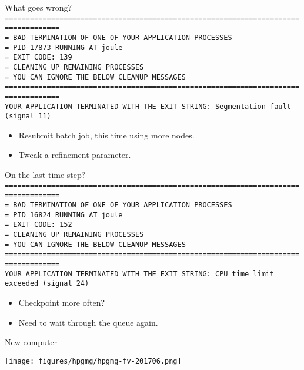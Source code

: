 \documentclass{beamer}
\begin{document}
\begin{frame}{What goes wrong?}
{\small \texttt{
=================================================================================== \\
=   BAD TERMINATION OF ONE OF YOUR APPLICATION PROCESSES \\
=   PID 17873 RUNNING AT joule \\
=   EXIT CODE: 139 \\
=   CLEANING UP REMAINING PROCESSES \\
=   YOU CAN IGNORE THE BELOW CLEANUP MESSAGES \\
=================================================================================== \\
YOUR APPLICATION TERMINATED WITH THE EXIT STRING: Segmentation fault (signal 11) \\
}}
\begin{itemize}
\item Resubmit batch job, this time using more nodes.
\item Tweak a refinement parameter.
\end{itemize}
\end{frame}
\begin{frame}{On the last time step?}
{\small \texttt{
=================================================================================== \\
=   BAD TERMINATION OF ONE OF YOUR APPLICATION PROCESSES \\
=   PID 16824 RUNNING AT joule \\
=   EXIT CODE: 152 \\
=   CLEANING UP REMAINING PROCESSES \\
=   YOU CAN IGNORE THE BELOW CLEANUP MESSAGES \\
=================================================================================== \\
YOUR APPLICATION TERMINATED WITH THE EXIT STRING: CPU time limit exceeded (signal 24) \\
}}
\begin{itemize}
\item Checkpoint more often?
\item Need to wait through the queue again.
\end{itemize}
\end{frame}

\begin{frame}{New computer}
  \begin{center}
    \texttt{[image: figures/hpgmg/hpgmg-fv-201706.png]}
  \end{center}
\end{frame}
\end{document}
